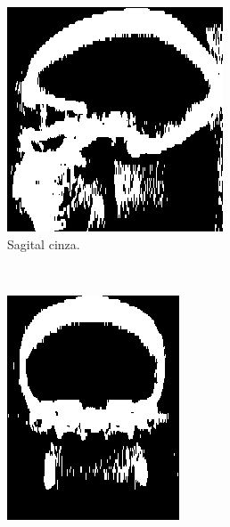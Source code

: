 \documentclass{article}
\begin{document}
\begin{figure}[h]
    \centering
    \begin{subfigure}[b]{0.3\textwidth}
        \includegraphics[width=\textwidth]{skull/radiologist-sagital-gray.png}
        \caption{Sagital cinza.}
    \end{subfigure}
    ~
    \begin{subfigure}[b]{0.3\textwidth}
        \includegraphics[width=\textwidth]{skull/radiologist-coronal-gray.png}

\end{subfigure}
\end{figure}
\end{document}
